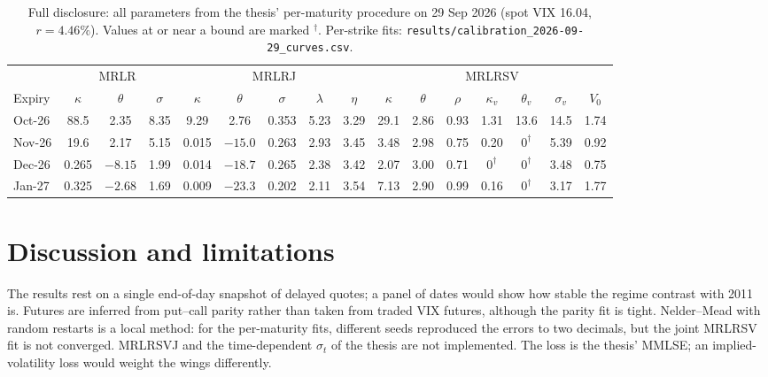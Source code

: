 \documentclass[10pt,twocolumn]{article}
\begin{document}
\begin{table}[t]
\centering\small
\caption{Full disclosure: all parameters from the thesis' per-maturity procedure on
29 Sep 2026 (spot VIX 16.04, $r=4.46\%$). Values at or near a bound are
marked $^\dagger$. Per-strike fits: \texttt{results/calibration\_2026-09-29\_curves.csv}.}
\label{tab:params}
\setlength{\tabcolsep}{5pt}
\begin{tabular}{@{}l ccc ccccc ccccccc@{}}
\toprule
 & \multicolumn{3}{c}{MRLR} & \multicolumn{5}{c}{MRLRJ} & \multicolumn{7}{c}{MRLRSV}\\
\cmidrule(lr){2-4}\cmidrule(lr){5-9}\cmidrule(l){10-16}
Expiry & $\kappa$ & $\theta$ & $\sigma$ & $\kappa$ & $\theta$ & $\sigma$ & $\lambda$ & $\eta$
 & $\kappa$ & $\theta$ & $\rho$ & $\kappa_v$ & $\theta_v$ & $\sigma_v$ & $V_0$\\
\midrule
Oct-26 & 88.5 & 2.35 & 8.35 & 9.29 & 2.76 & 0.353 & 5.23 & 3.29 & 29.1 & 2.86 & 0.93 & 1.31 & 13.6 & 14.5 & 1.74\\
Nov-26 & 19.6 & 2.17 & 5.15 & 0.015 & $-15.0$ & 0.263 & 2.93 & 3.45 & 3.48 & 2.98 & 0.75 & 0.20 & $0^\dagger$ & 5.39 & 0.92\\
Dec-26 & 0.265 & $-8.15$ & 1.99 & 0.014 & $-18.7$ & 0.265 & 2.38 & 3.42 & 2.07 & 3.00 & 0.71 & $0^\dagger$ & $0^\dagger$ & 3.48 & 0.75\\
Jan-27 & 0.325 & $-2.68$ & 1.69 & 0.009 & $-23.3$ & 0.202 & 2.11 & 3.54 & 7.13 & 2.90 & 0.99 & 0.16 & $0^\dagger$ & 3.17 & 1.77\\
\bottomrule
\end{tabular}
\end{table}

\section{Discussion and limitations}
The results rest on a single end-of-day snapshot of delayed quotes; a panel of dates
would show how stable the regime contrast with 2011 is. Futures are inferred from
put--call parity rather than taken from traded VIX futures, although the parity fit
is tight. Nelder--Mead with random restarts is a local method: for the per-maturity fits,
different seeds reproduced the errors to two decimals, but the joint MRLRSV fit is not
converged. MRLRSVJ and the time-dependent $\sigma_t$ of the thesis are not
implemented. The loss is the thesis' MMLSE; an implied-volatility loss would weight the
wings differently.
\end{document}
